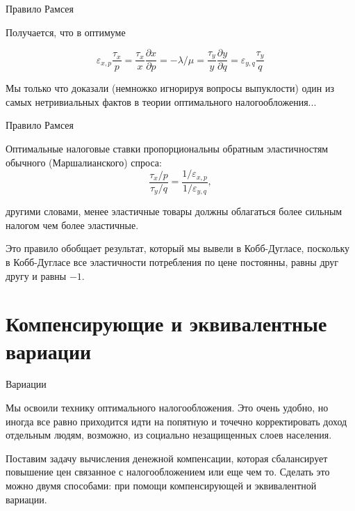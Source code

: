 \documentclass{beamer}
\begin{document}
\begin{frame}{Правило Рамсея}

Получается, что в оптимуме

$$ \varepsilon_{x,p}\frac{\tau_{x}}{p} = \frac{\tau_x}{x} \frac{\partial x}{\partial p} = - \lambda / \mu = \frac{\tau_y}{y} \frac{\partial y}{\partial q} = \varepsilon_{y,q}\frac{\tau_{y}}{q}$$

Мы только что доказали (немножко игнорируя вопросы выпуклости) один из самых нетривиальных фактов в теории оптимального налогообложения...

\end{frame}

\begin{frame}{Правило Рамсея}

\begin{lemma}
Оптимальные налоговые ставки пропорциональны обратным эластичностям обычного (Маршалианского) спроса:
$$ \frac{\tau_x/p}{\tau_y/q} = \frac{1/\varepsilon_{x,p}}{1/\varepsilon_{y,q}},$$

другими словами, менее эластичные товары должны облагаться более сильным налогом чем более эластичные.
\end{lemma}

Это правило обобщает результат, который мы вывели в Кобб-Дугласе, поскольку в Кобб-Дугласе все эластичности потребления по цене постоянны, равны друг другу и равны $-1$.

\end{frame}

\section{Компенсирующие и эквивалентные вариации}

\begin{frame}{Вариации}

Мы освоили технику оптимального налогообложения. Это очень удобно, но иногда все равно приходится идти на попятную и точечно корректировать доход отдельным людям, возможно, из социально незащищенных слоев населения.

Поставим задачу вычисления денежной компенсации, которая сбалансирует повышение цен связанное с налогообложением или еще чем то. Сделать это можно двумя способами: при помощи компенсирующей и эквивалентной вариации.

\end{frame}
\end{document}
